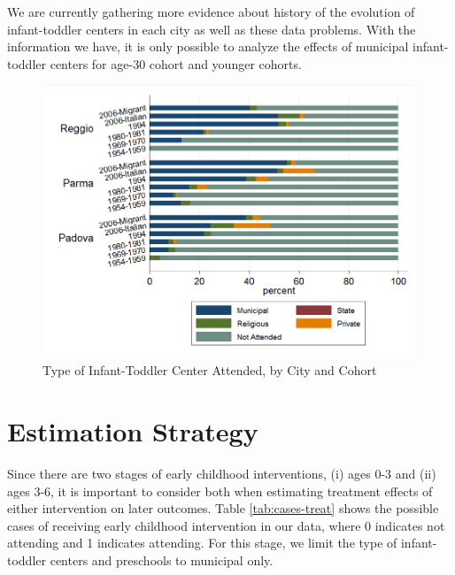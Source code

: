 We are currently gathering more evidence about history of the evolution of infant-toddler centers in each city as well as these data problems. With the information we have, it is only possible to analyze the effects of municipal infant-toddler centers for age-30 cohort and younger cohorts.

\begin{landscape}
\begin{figure}[H]
\caption{Type of Infant-Toddler Center Attended, by City and Cohort} \label{fig:attended-itc}
\includegraphics[scale=0.63]{../../../../output/image/asiloType-Attend.png} 
\end{figure}
\end{landscape}


\section{Estimation Strategy} \label{sec:estimation}

Since there are two stages of early childhood interventions, (i) ages 0-3 and (ii) ages 3-6, it is important to consider both when estimating treatment effects of either intervention on later outcomes. Table \ref{tab:cases-treat} shows the possible cases of receiving early childhood intervention in our data, where 0 indicates not attending and 1 indicates attending. For this stage, we limit the type of infant-toddler centers and preschools to municipal only. 

